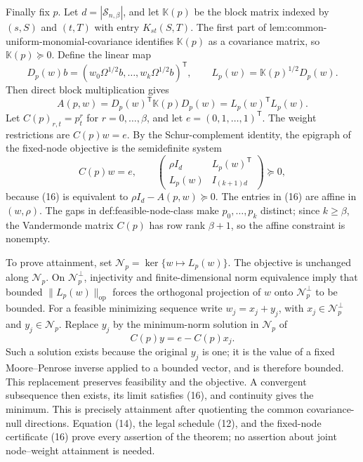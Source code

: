 Finally fix \(p\).  Let \(d=|\mathcal S_{n,\beta}|\), and let \(\mathbb K(p)\) be the block matrix indexed by \((s,S)\) and \((t,T)\) with entry \(K_{st}(S,T)\).  The first part of lem:common-uniform-monomial-covariance identifies \(\mathbb K(p)\) as a covariance matrix, so \(\mathbb K(p)\succeq0\).  Define the linear map
\[
D_p(w)b=(w_0\Omega^{1/2}b,\ldots,w_k\Omega^{1/2}b)^{\mathsf T},
\qquad L_p(w)=\mathbb K(p)^{1/2}D_p(w).
\]
Then direct block multiplication gives
\[
A(p,w)=D_p(w)^{\mathsf T}\mathbb K(p)D_p(w)=L_p(w)^{\mathsf T}L_p(w).
\tag{15}
\]
Let \(C(p)_{r,t}=p_t^r\) for \(r=0,\ldots,\beta\), and let \(e=(0,1,\ldots,1)^{\mathsf T}\).  The weight restrictions are \(C(p)w=e\).  By the Schur-complement identity, the epigraph of the fixed-node objective is the semidefinite system
\[
C(p)w=e,
\qquad
\begin{pmatrix}
\rho I_d&L_p(w)^{\mathsf T}\\
L_p(w)&I_{(k+1)d}
\end{pmatrix}\succeq0,
\tag{16}
\]
because (16) is equivalent to \(\rho I_d-A(p,w)\succeq0\).  The entries in (16) are affine in \((w,\rho)\).  The gaps in def:feasible-node-class make \(p_0,\ldots,p_k\) distinct; since \(k\ge\beta\), the Vandermonde matrix \(C(p)\) has row rank \(\beta+1\), so the affine constraint is nonempty.

To prove attainment, set \(\mathcal N_p=\ker\{w\mapsto L_p(w)\}\).  The objective is unchanged along \(\mathcal N_p\).  On \(\mathcal N_p^\perp\), injectivity and finite-dimensional norm equivalence imply that bounded \(\|L_p(w)\|_{\mathrm{op}}\) forces the orthogonal projection of \(w\) onto \(\mathcal N_p^\perp\) to be bounded.  For a feasible minimizing sequence write \(w_j=x_j+y_j\), with \(x_j\in\mathcal N_p^\perp\) and \(y_j\in\mathcal N_p\).  Replace \(y_j\) by the minimum-norm solution in \(\mathcal N_p\) of
\[
C(p)y=e-C(p)x_j.
\]
Such a solution exists because the original \(y_j\) is one; it is the value of a fixed Moore--Penrose inverse applied to a bounded vector, and is therefore bounded.  This replacement preserves feasibility and the objective.  A convergent subsequence then exists, its limit satisfies (16), and continuity gives the minimum.  This is precisely attainment after quotienting the common covariance-null directions.  Equation (14), the legal schedule (12), and the fixed-node certificate (16) prove every assertion of the theorem; no assertion about joint node--weight attainment is needed.